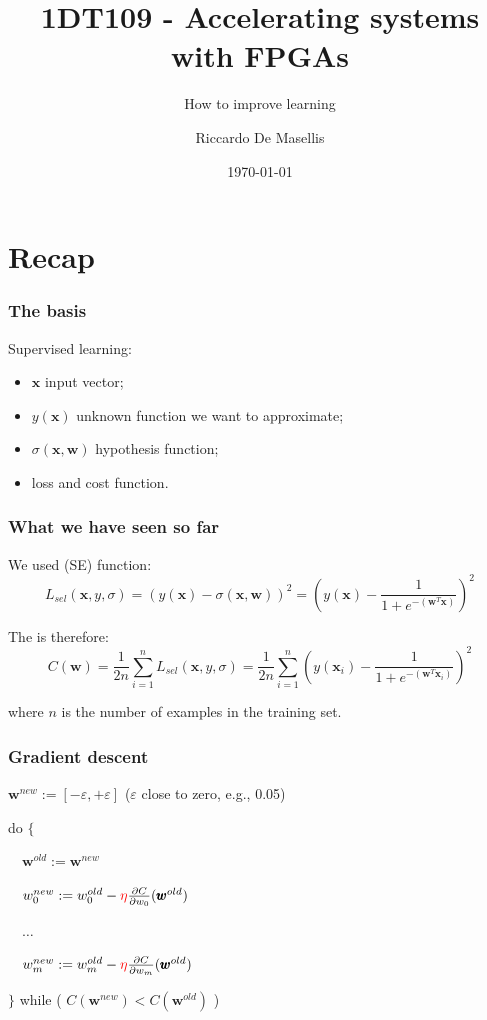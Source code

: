 \documentclass[usenames,dvipsnames]{beamer}
\title{1DT109 - Accelerating systems with FPGAs}
\subtitle{How to improve learning}
\author[R.\ De Masellis]{Riccardo De Masellis}
\date[]{\today}
\institute[uu.se]{Uppsala University}
\begin{document}
\begin{frame}[plain]
  \titlepage
\end{frame}
\section{Recap}
\begin{frame}
  \frametitle{The basis}

Supervised learning:

\begin{itemize}
\item $\pmb{x}$ input vector;
\item $y(\pmb{x})$ unknown function we want to approximate;
\item $\sigma(\pmb{x}, \pmb{w})$ hypothesis function;
\item loss and cost function. 	
\end{itemize}


\end{frame}

\begin{frame}
\frametitle{What we have seen so far}

We used  (SE) function:
\[ 
   L_{sel}(\pmb{x}, y, \sigma) = (y(\pmb{x}) - \sigma(\pmb{x}, \pmb{w}))^2 = (y(\pmb{x}) - \frac{1}{1 + e^{-(\pmb{w}^T \pmb{x})}})^2
  \]
  
  \largeskip \pause
  
  The  is therefore:
  \[
  C(\pmb{w}) = \frac{1}{2n} \sum_{i=1}^n  L_{sel}(\pmb{x}, y, \sigma) = \frac{1}{2n} \sum_{i=1}^n (y(\pmb{x}_i) - \frac{1}{1 + e^{-(\pmb{w}^T \pmb{x}_i)}})^2
  \]
  
  where $n$ is the number of examples in the training set.

  \end{frame}

\begin{frame}
  \frametitle{Gradient descent}
  
$\pmb{w}^{new} := [-\varepsilon, +\varepsilon]$ ($\varepsilon$ close to zero, e.g., 0.05) 
 
 \bigskip
   
 do $\{$
 
 \bigskip
 
 $\quad \pmb{w}^{old} := \pmb{w}^{new}$
 
 \bigskip
$\quad w_0^{new} := w_0^{old} - \tc{red}{\eta} \frac{\partial C}{\partial w_0} (\pmb{w}^{old})$
 
 
$\quad \ldots$
 
$\quad w_m^{new} := w_m^{old} - \tc{red}{\eta} \frac{\partial C}{\partial w_m}(\pmb{w}^{old})$

\bigskip
  
  $\}$ while ( $C(\pmb{w}^{new}) < C(\pmb{w}^{old})$ )

\end{frame}
\end{document}
